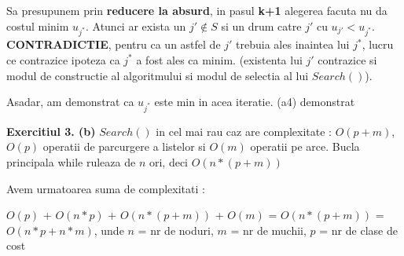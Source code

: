 \documentclass{article}
\begin{document}
Sa presupunem prin \textbf{reducere la absurd}, in pasul \textbf{k+1} alegerea facuta nu da costul minim $u_{j^*}$. Atunci ar exista un $j' \notin S$ si un drum catre $j'$ cu $u_{j'} < u_{j^*}$. \textbf{CONTRADICTIE}, pentru ca un astfel de $j'$ trebuia ales inaintea lui $j^*$, lucru ce contrazice ipoteza ca $j^*$ a fost ales ca minim. (existenta lui $j'$ contrazice si modul de constructie al algoritmului si modul de selectia al lui $Search()$).

Asadar, am demonstrat ca $u_{j^*}$ este min in acea iteratie. (a4) demonstrat

\textbf{Exercitiul 3. (b) }
$Search()$ in cel mai rau caz are complexitate : $O(p+m)$, $O(p)$ operatii de parcurgere a listelor si $O(m)$ operatii pe arce. Bucla principala while ruleaza de $n$ ori, deci $O(n*(p+m))$

Avem urmatoarea suma de complexitati : 

$O(p)$ + $O(n*p)$ + $O(n*(p+m))$ + $O(m)$ = $O(n*(p+m))$ = $O(n*p+n*m)$, unde $n$ = nr de noduri, $m$ = nr de muchii, $p$ = nr de clase de cost
\end{document}
